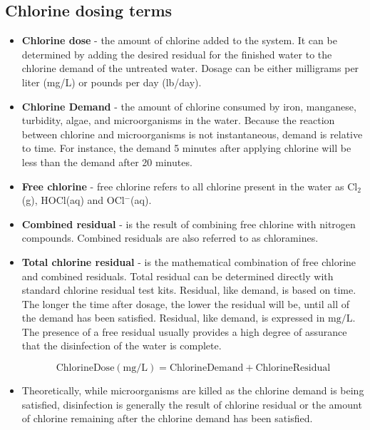 \subsection{Chlorine dosing terms}
\begin{itemize}
\item \textbf{Chlorine dose}  - the amount of chlorine added to the system. It can be determined by adding the desired residual for the finished water to the chlorine demand of the untreated water. Dosage can be either milligrams per liter (mg/L) or pounds per day (lb/day).

\item \textbf{Chlorine Demand}   - the amount of chlorine consumed by iron, manganese, turbidity, algae, and microorganisms in the water. Because the reaction between chlorine and microorganisms is not instantaneous, demand is relative to time. For instance, the demand 5 minutes after applying chlorine will be less than the demand after 20 minutes. 

\item \textbf{Free chlorine}   - free chlorine refers to all chlorine present in the water as Cl$_2$(g), HOCl(aq) and OCl$^-$(aq).

\item \textbf{Combined residual}  - is the result of combining free chlorine with nitrogen compounds. Combined residuals are also referred to as chloramines. 

\item \textbf{Total chlorine residual}  - is the mathematical combination of free chlorine and combined residuals. Total residual can be determined directly with standard chlorine residual test kits.  Residual, like demand, is based on time. The longer the time after dosage, the lower the residual will be, until all of the demand has been satisfied. Residual, like demand, is expressed in $\mathrm{mg} / \mathrm{L}$. The presence of a free residual usually provides a high degree of assurance that the disinfection of the water is complete. 

$$\mathrm{Chlorine Dose} (\mathrm{mg} / \mathrm{L})= \mathrm{Chlorine Demand}+ \mathrm{ Chlorine Residual}$$

\item Theoretically, while microorganisms are killed as the chlorine demand is being satisfied, disinfection is generally the result of chlorine residual or the amount of chlorine remaining after the chlorine demand has been satisfied.
\end{itemize}



